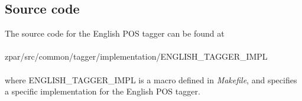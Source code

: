 \documentclass[12pt]{article}
\begin{document}
\begin{CJK}{GBK}{song}
\section{Source code}
The source code for the English POS tagger can be found at
\\
\\
\hspace{3cm} zpar/src/common/tagger/implementation/ENGLISH\_TAGGER\_IMPL
\\
\\
where ENGLISH\_TAGGER\_IMPL is a macro defined in \textit{Makefile}, and specifies a specific implementation for the English POS tagger.
\end{CJK}
\end{document}

